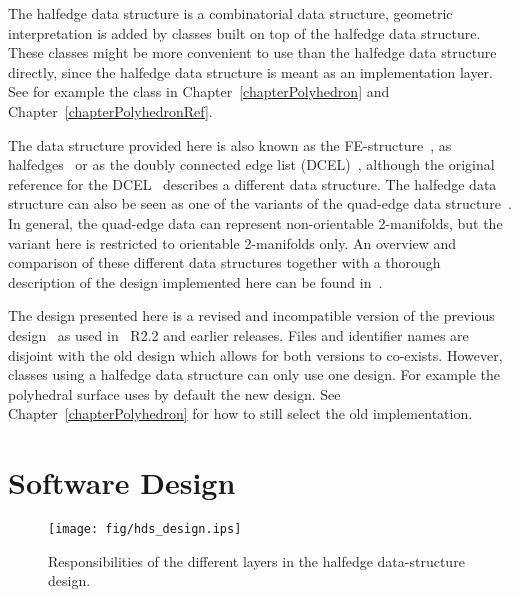 The halfedge data structure is a combinatorial data structure,
geometric interpretation is added by classes built on top of the
halfedge data structure.  These classes might be more convenient to
use than the halfedge data structure directly, since the halfedge data
structure is meant as an implementation layer.  See for example the
 class in Chapter~\ref{chapterPolyhedron}
and Chapter~\ref{chapterPolyhedronRef}.

The data structure provided here is also known as the
FE-structure~\cite{w-ebdss-85}, as
halfedges~\cite{m-ism-88,bfh-mgedm-95} or as the doubly connected edge
list (DCEL)~\cite{bkos-cgaa-97}, although the original reference for
the DCEL~\cite{mp-fitcp-78} describes a different data structure. The
halfedge data structure can also be seen as one of the variants of the
quad-edge data structure~\cite{gs-pmgsc-85}. In general, the quad-edge
data can represent non-orientable 2-manifolds, but the variant here is
restricted to orientable 2-manifolds only. An overview and comparison
of these different data structures together with a thorough
description of the design implemented here can be found
in~\cite{k-ugpdd-99}.  

The design presented here is a revised and incompatible version of the
previous design~\cite{k-ddsps-98} as used in \cgal\ R2.2 and earlier
releases. Files and identifier names are disjoint with the old design
which allows for both versions to co-exists. However, classes using a
halfedge data structure can only use one design. For example the
polyhedral surface  uses by default the new
design. See Chapter~\ref{chapterPolyhedron} for how to still select
the old implementation.

\section{Software Design}


\begin{ccTexOnly}
  \begin{figure}
    \begin{center}
      \parbox{0.7\textwidth}{%
          \texttt{[image: fig/hds\_design.ips]}%
      }
    \end{center}
    \caption{Responsibilities of the different layers in the 
             halfedge data-structure design.}
    \label{figureHalfedgeDSDesign}
  \end{figure}
\end{ccTexOnly}

